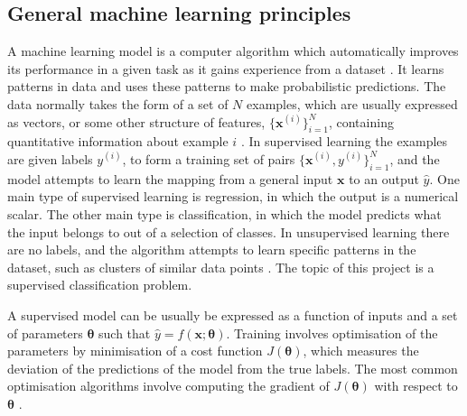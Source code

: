 \documentclass[12pt]{article}
\begin{document}
\subsection{General machine learning principles}
A machine learning model is a computer algorithm which automatically improves its performance in a given task as it gains experience from a dataset \cite{Goodfellow16}. It learns patterns in data and uses these patterns to make probabilistic predictions. The data normally takes the form of a set of $N$ examples, which are usually expressed as vectors, or some other structure of features, $\{\bm{x}^{(i)}\}_{i=1}^N$, containing quantitative information about example $i$ \cite{Murphy12}. In supervised learning the examples are given labels $y^{(i)}$, to form a training set of pairs $\{\bm{x}^{(i)}, y^{(i)}\}_{i=1}^N$, and the model attempts to learn the mapping from a general input $\bm{x}$ to an output $\hat{y}$. One main type of supervised learning is regression, in which the output is a numerical scalar. The other main type is classification, in which the model predicts what the input belongs to out of a selection of classes. In unsupervised learning there are no labels, and the algorithm attempts to learn specific patterns in the dataset, such as clusters of similar data points \cite{Murphy12}. The topic of this project is a supervised classification problem.

A supervised model can be usually be expressed as a function of inputs and a set of parameters $\bm\theta$ such that $\hat{y}=f(\bm{x};\bm\theta)$. Training involves optimisation of the parameters by minimisation of a cost function $J(\bm\theta)$, which measures the deviation of the predictions of the model from the true labels. The most common optimisation algorithms involve computing the gradient of $J(\bm\theta)$ with respect to $\bm\theta$ \cite{Goodfellow16}. 
\end{document}
